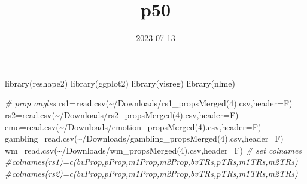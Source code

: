 \documentclass[
]{article}
\title{p50}
\author{}
\date{\vspace{-2.5em}2023-07-13}
\newenvironment{Shaded}{\begin{snugshade}}{\end{snugshade}}
\newcommand{\AttributeTok}[1]{\textcolor[rgb]{0.77,0.63,0.00}{#1}}
\newcommand{\CommentTok}[1]{\textcolor[rgb]{0.56,0.35,0.01}{\textit{#1}}}
\newcommand{\FunctionTok}[1]{\textcolor[rgb]{0.00,0.00,0.00}{#1}}
\newcommand{\NormalTok}[1]{#1}
\newcommand{\OtherTok}[1]{\textcolor[rgb]{0.56,0.35,0.01}{#1}}
\newcommand{\StringTok}[1]{\textcolor[rgb]{0.31,0.60,0.02}{#1}}
\begin{document}
\maketitle

\begin{Shaded}
\begin{Highlighting}[]
\FunctionTok{library}\NormalTok{(reshape2)}
\FunctionTok{library}\NormalTok{(ggplot2)}
\FunctionTok{library}\NormalTok{(visreg)}
\FunctionTok{library}\NormalTok{(nlme)}
\end{Highlighting}
\end{Shaded}

\begin{Shaded}
\begin{Highlighting}[]
\CommentTok{\# prop angles}
\NormalTok{rs1}\OtherTok{=}\FunctionTok{read.csv}\NormalTok{(}\StringTok{\textquotesingle{}\textasciitilde{}/Downloads/rs1\_propsMerged(4).csv\textquotesingle{}}\NormalTok{,}\AttributeTok{header=}\NormalTok{F)}
\NormalTok{rs2}\OtherTok{=}\FunctionTok{read.csv}\NormalTok{(}\StringTok{\textquotesingle{}\textasciitilde{}/Downloads/rs2\_propsMerged(4).csv\textquotesingle{}}\NormalTok{,}\AttributeTok{header=}\NormalTok{F)}
\NormalTok{emo}\OtherTok{=}\FunctionTok{read.csv}\NormalTok{(}\StringTok{\textquotesingle{}\textasciitilde{}/Downloads/emotion\_propsMerged(4).csv\textquotesingle{}}\NormalTok{,}\AttributeTok{header=}\NormalTok{F)}
\NormalTok{gambling}\OtherTok{=}\FunctionTok{read.csv}\NormalTok{(}\StringTok{\textquotesingle{}\textasciitilde{}/Downloads/gambling\_propsMerged(4).csv\textquotesingle{}}\NormalTok{,}\AttributeTok{header=}\NormalTok{F)}
\NormalTok{wm}\OtherTok{=}\FunctionTok{read.csv}\NormalTok{(}\StringTok{\textquotesingle{}\textasciitilde{}/Downloads/wm\_propsMerged(4).csv\textquotesingle{}}\NormalTok{,}\AttributeTok{header=}\NormalTok{F)}
\CommentTok{\# set colnames}
\CommentTok{\#colnames(rs1)=c(\textquotesingle{}bvProp\textquotesingle{},\textquotesingle{}pProp\textquotesingle{},\textquotesingle{}m1Prop\textquotesingle{},\textquotesingle{}m2Prop\textquotesingle{},\textquotesingle{}bvTRs\textquotesingle{},\textquotesingle{}pTRs\textquotesingle{},\textquotesingle{}m1TRs\textquotesingle{},\textquotesingle{}m2TRs\textquotesingle{})}
\CommentTok{\#colnames(rs2)=c(\textquotesingle{}bvProp\textquotesingle{},\textquotesingle{}pProp\textquotesingle{},\textquotesingle{}m1Prop\textquotesingle{},\textquotesingle{}m2Prop\textquotesingle{},\textquotesingle{}bvTRs\textquotesingle{},\textquotesingle{}pTRs\textquotesingle{},\textquotesingle{}m1TRs\textquotesingle{},\textquotesingle{}m2TRs\textquotesingle{})}

\end{Highlighting}
\end{Shaded}
\end{document}
